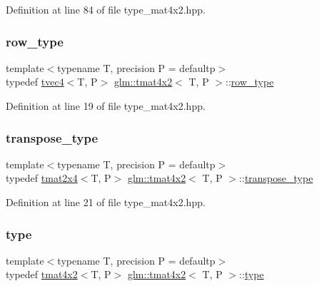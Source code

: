 Definition at line 84 of file type\+\_\+mat4x2.\+hpp.

\mbox{\label{structglm_1_1tmat4x2_a3bef891d2ec9d87bc5ada0602ad3122f}} 
\subsubsection{\texorpdfstring{row\_type}{row\_type}}
{\footnotesize\ttfamily template$<$typename T, precision P = defaultp$>$ \\
typedef \mbox{\hyperlink{structglm_1_1tvec4}{tvec4}}$<$T, P$>$ \mbox{\hyperlink{structglm_1_1tmat4x2}{glm\+::tmat4x2}}$<$ T, P $>$\+::\mbox{\hyperlink{structglm_1_1tmat4x2_a3bef891d2ec9d87bc5ada0602ad3122f}{row\+\_\+type}}}



Definition at line 19 of file type\+\_\+mat4x2.\+hpp.

\mbox{\label{structglm_1_1tmat4x2_a5eede582c47564806cff64584a24726c}} 
\subsubsection{\texorpdfstring{transpose\_type}{transpose\_type}}
{\footnotesize\ttfamily template$<$typename T, precision P = defaultp$>$ \\
typedef \mbox{\hyperlink{structglm_1_1tmat2x4}{tmat2x4}}$<$T, P$>$ \mbox{\hyperlink{structglm_1_1tmat4x2}{glm\+::tmat4x2}}$<$ T, P $>$\+::\mbox{\hyperlink{structglm_1_1tmat4x2_a5eede582c47564806cff64584a24726c}{transpose\+\_\+type}}}



Definition at line 21 of file type\+\_\+mat4x2.\+hpp.

\mbox{\label{structglm_1_1tmat4x2_a92c6e11d269f4f72087d8152689f16f1}} 
\subsubsection{\texorpdfstring{type}{type}}
{\footnotesize\ttfamily template$<$typename T, precision P = defaultp$>$ \\
typedef \mbox{\hyperlink{structglm_1_1tmat4x2}{tmat4x2}}$<$T, P$>$ \mbox{\hyperlink{structglm_1_1tmat4x2}{glm\+::tmat4x2}}$<$ T, P $>$\+::\mbox{\hyperlink{structglm_1_1tmat4x2_a92c6e11d269f4f72087d8152689f16f1}{type}}}



